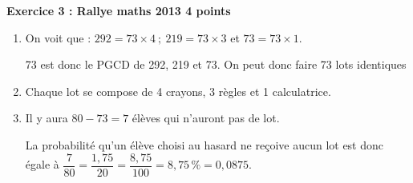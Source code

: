 \textbf{Exercice 3 : Rallye maths 2013 \hfill 4 points}

\medskip 

%

\begin{enumerate}
\item %
On voit que : $292 = 73 \times 4\:;\: 219 = 73 \times 3$
 et $73 = 73 \times 1$.
 
73 est donc le PGCD de 292, 219 et 73. On peut donc faire 73 lots identiques 
\item %
Chaque lot se compose de  4 crayons, 3 règles et 1 calculatrice. 
\item %
Il y aura $80 - 73 = 7$ élèves qui n'auront pas de lot.

La probabilité qu'un élève choisi au hasard ne reçoive aucun lot est donc égale à $\dfrac{7}{80} = \dfrac{1,75}{20} = \dfrac{8,75}{100} = 8,75\,\% = 0,0875$.
\end{enumerate}

\vspace{0,5cm}


